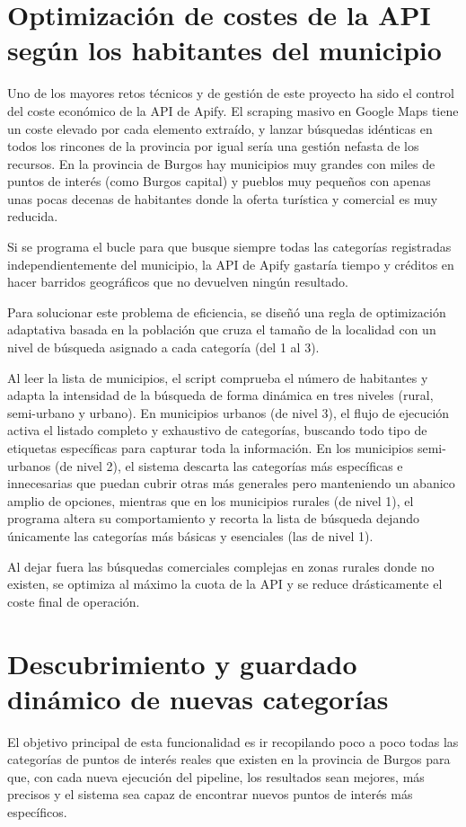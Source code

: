\section{Optimización de costes de la API según los habitantes del municipio}
Uno de los mayores retos técnicos y de gestión de este proyecto ha sido el control del coste económico de la API de Apify. El scraping masivo en Google Maps tiene un coste elevado por cada elemento extraído, y lanzar búsquedas idénticas en todos los rincones de la provincia por igual sería una gestión nefasta de los recursos. En la provincia de Burgos hay municipios muy grandes con miles de puntos de interés (como Burgos capital) y pueblos muy pequeños con apenas unas pocas decenas de habitantes donde la oferta turística y comercial es muy reducida.

Si se programa el bucle para que busque siempre todas las categorías registradas independientemente del municipio, la API de Apify gastaría tiempo y créditos en hacer barridos geográficos que no devuelven ningún resultado.

Para solucionar este problema de eficiencia, se diseñó una regla de optimización adaptativa basada en la población que cruza el tamaño de la localidad con un nivel de búsqueda asignado a cada categoría (del 1 al 3).

Al leer la lista de municipios, el script comprueba el número de habitantes y adapta la intensidad de la búsqueda de forma dinámica en tres niveles (rural, semi-urbano y urbano). En municipios urbanos (de nivel 3), el flujo de ejecución activa el listado completo y exhaustivo de categorías, buscando todo tipo de etiquetas específicas para capturar toda la información. En los municipios semi-urbanos (de nivel 2), el sistema descarta las categorías más específicas e innecesarias que puedan cubrir otras más generales pero manteniendo un abanico amplio de opciones, mientras que en los municipios rurales (de nivel 1), el programa altera su comportamiento y recorta la lista de búsqueda dejando únicamente las categorías más básicas y esenciales (las de nivel 1).

Al dejar fuera las búsquedas comerciales complejas en zonas rurales donde no existen, se optimiza al máximo la cuota de la API y se reduce drásticamente el coste final de operación.

\section{Descubrimiento y guardado dinámico de nuevas categorías}
El objetivo principal de esta funcionalidad es ir recopilando poco a poco todas las categorías de puntos de interés reales que existen en la provincia de Burgos para que, con cada nueva ejecución del pipeline, los resultados sean mejores, más precisos y el sistema sea capaz de encontrar nuevos puntos de interés más específicos. 

